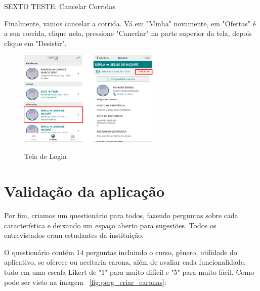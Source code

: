 SEXTO TESTE: Cancelar Corridas

Finalmente, vamos cancelar a corrida. Vá em "Minha" novamente, em "Ofertas" é a sua corrida, clique nela, pressione "Cancelar" na parte superior da tela, depois clique em "Desistir".

\begin{figure}[H]
	\centering
	\caption{Tela de Login}
	\includegraphics[width=0.6\textwidth]{./04-figuras/manual/cancelar_carona.png}
	\label{fig:cancelar_carona}
\end{figure}


\section{Validação da aplicação}

Por fim, criamos um questionário para todos, fazendo perguntas sobre cada característica e deixando um espaço aberto para sugestões. Todos os entrevistados eram estudantes da instituição.

O questionário contém 14 perguntas incluindo o curso, gênero, utilidade do aplicativo, se oferece ou aceitaria carona, além de avaliar cada funcionalidade, tudo em uma escala Likert de "1" para muito difícil e "5" para muito fácil. Como pode ser visto na imagem ~\ref{fig:perg_criar_caronas}:

